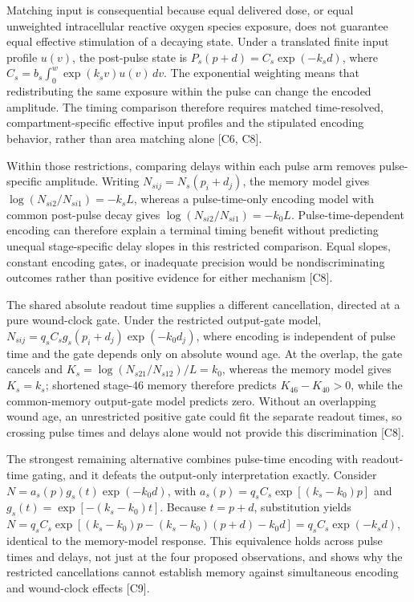 \documentclass[11pt]{article}
\begin{document}
Matching input is consequential because equal delivered dose, or equal unweighted intracellular reactive oxygen species exposure, does not guarantee equal effective stimulation of a decaying state. Under a translated finite input profile $u(v)$, the post-pulse state is $P_s(p+d)=C_s\exp(-k_sd)$, where $C_s=b_s\int_0^w\exp(k_sv)u(v)\,dv$. The exponential weighting means that redistributing the same exposure within the pulse can change the encoded amplitude. The timing comparison therefore requires matched time-resolved, compartment-specific effective input profiles and the stipulated encoding behavior, rather than area matching alone [C6, C8].

Within those restrictions, comparing delays within each pulse arm removes pulse-specific amplitude. Writing $N_{sij}=N_s(p_i+d_j)$, the memory model gives $\log(N_{si2}/N_{si1})=-k_sL$, whereas a pulse-time-only encoding model with common post-pulse decay gives $\log(N_{si2}/N_{si1})=-k_0L$. Pulse-time-dependent encoding can therefore explain a terminal timing benefit without predicting unequal stage-specific delay slopes in this restricted comparison. Equal slopes, constant encoding gates, or inadequate precision would be nondiscriminating outcomes rather than positive evidence for either mechanism [C8].

The shared absolute readout time supplies a different cancellation, directed at a pure wound-clock gate. Under the restricted output-gate model, $N_{sij}=q_sC_sg_s(p_i+d_j)\exp(-k_0d_j)$, where encoding is independent of pulse time and the gate depends only on absolute wound age. At the overlap, the gate cancels and $K_s=\log(N_{s21}/N_{s12})/L=k_0$, whereas the memory model gives $K_s=k_s$; shortened stage-46 memory therefore predicts $K_{46}-K_{40}>0$, while the common-memory output-gate model predicts zero. Without an overlapping wound age, an unrestricted positive gate could fit the separate readout times, so crossing pulse times and delays alone would not provide this discrimination [C8].

The strongest remaining alternative combines pulse-time encoding with readout-time gating, and it defeats the output-only interpretation exactly. Consider $N=a_s(p)g_s(t)\exp(-k_0d)$, with $a_s(p)=q_sC_s\exp[(k_s-k_0)p]$ and $g_s(t)=\exp[-(k_s-k_0)t]$. Because $t=p+d$, substitution yields $N=q_sC_s\exp[(k_s-k_0)p-(k_s-k_0)(p+d)-k_0d]=q_sC_s\exp(-k_sd)$, identical to the memory-model response. This equivalence holds across pulse times and delays, not just at the four proposed observations, and shows why the restricted cancellations cannot establish memory against simultaneous encoding and wound-clock effects [C9].
\end{document}

